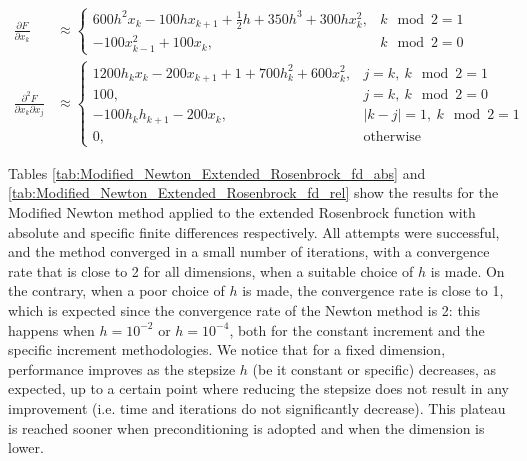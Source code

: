 \begin{align*}
    \frac{\partial F}{\partial x_k} &\approx \left \{ \begin{array}{ll}
        600h^2 x_k - 100hx_{k+1} + \frac12h + 350h^3 + 300hx_k^2, & k\mod 2 = 1\\
        -100x_{k-1}^2 + 100x_k, & k\mod 2 = 0
    \end{array} \right .\\
    \frac{\partial^2 F}{\partial x_k \partial x_j} &\approx \left \{ \begin{array}{ll}
        1200h_k x_k - 200x_{k+1} + 1 + 700h_k^2 + 600x_k^2, & j = k,\ k\mod 2 = 1\\
        100, & j = k,\ k\mod 2 = 0\\
        -100 h_k h_{k+1} - 200 x_k, & \lvert k-j \rvert = 1,\ k\mod 2 = 1\\
        0, & \text{otherwise}
    \end{array} \right .
\end{align*}

Tables \ref{tab:Modified_Newton_Extended_Rosenbrock_fd_abs} and \ref{tab:Modified_Newton_Extended_Rosenbrock_fd_rel} show the results for the Modified Newton method applied to the extended Rosenbrock function with absolute and specific finite differences respectively.
All attempts were successful, and the method converged in a small number of iterations, with a convergence rate that is close to 2 for all dimensions, when a suitable choice of $h$ is made.
On the contrary, when a poor choice of $h$ is made, the convergence rate is close to 1, which is expected since the convergence rate of the Newton method is 2: this happens when $h=10^{-2}$ or $h=10^{-4}$, both for the constant increment and the specific increment methodologies.
We notice that for a fixed dimension, performance improves as the stepsize $h$ (be it constant or specific) decreases, as expected, up to a certain point where reducing the stepsize does not result in any improvement (i.e. time and iterations do not significantly decrease).
This plateau is reached sooner when preconditioning is adopted and when the dimension is lower.

